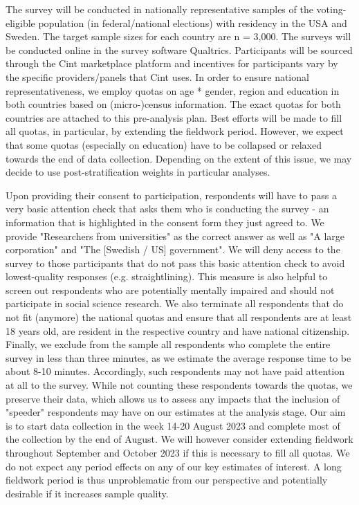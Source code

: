 \documentclass[12pt, letterpaper]{article}
\begin{document}
\begin{spacing}{1.5}
The survey will be conducted in nationally representative samples of the voting- eligible population (in federal/national elections) with residency in the USA and Sweden. The target sample sizes for each country are n = 3,000. The surveys will be conducted online in the survey software Qualtrics. Participants will be sourced through the Cint marketplace platform and incentives for participants vary by the specific providers/panels that Cint uses. In order to ensure national representativeness, we employ quotas on age * gender, region and education in both countries based on (micro-)census information. The exact quotas for both countries are attached to this pre-analysis plan. Best efforts will be made to fill all quotas, in particular, by extending the fieldwork period. However, we expect that some quotas (especially on education) have to be collapsed or relaxed towards the end of data collection. Depending on the extent of this issue, we may decide to use post-stratification weights in particular analyses.

Upon providing their consent to participation, respondents will have to pass a very basic attention check that asks them who is conducting the survey - an information that is highlighted in the consent form they just agreed to. We provide "Researchers from universities" as the correct answer as well as "A large corporation" and "The [Swedish / US] government". We will deny access to the survey to those participants that do not pass this basic attention check to avoid lowest-quality responses (e.g. straightlining). This measure is also helpful to screen out respondents who are potentially mentally impaired and should not participate in social science research. We also terminate all respondents that do not fit (anymore) the national quotas and ensure that all respondents are at least 18 years old, are resident in the respective country and have national citizenship. Finally, we exclude from the sample all respondents who complete the entire survey in less than three minutes, as we estimate the average response time to be about 8-10 minutes. Accordingly, such respondents may not have paid attention at all to the survey. While not counting these respondents towards the quotas, we preserve their data, which allows us to assess any impacts that the inclusion of "speeder" respondents may have on our estimates at the analysis stage.
Our aim is to start data collection in the week 14-20 August 2023 and complete most of the collection by the end of August. We will however consider extending fieldwork throughout September and October 2023 if this is necessary to fill all quotas. We do not expect any period effects on any of our key estimates of interest. A long fieldwork period is thus unproblematic from our perspective and potentially desirable if it increases sample quality.






\end{spacing}
\end{document}
